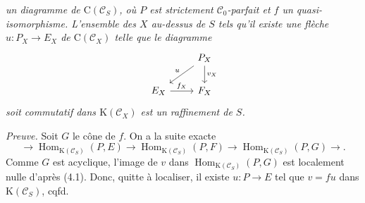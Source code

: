 \documentclass[11pt]{article}
\newcommand{\Spec}{\operatorname{Spec}}
\providecommand{\cC}{\mathcal C}
\providecommand{\Coker}{\operatorname{Coker}}
\providecommand{\Ker}{\operatorname{Ker}}
\providecommand{\cO}{\mathcal O}
\begin{document}
\providecommand{\cC}{\mathcal C}
\providecommand{\cD}{\mathcal D}
\providecommand{\cK}{\mathcal K}
\providecommand{\cO}{\mathcal O}
\providecommand{\cS}{\mathcal S}
\providecommand{\Cpx}{\mathrm C}
\providecommand{\Kpx}{\mathrm K}
\providecommand{\Dpx}{\mathrm D}
\providecommand{\D}{\mathrm D}
\providecommand{\Ho}{\mathrm H}
\providecommand{\RHom}{\mathrm R\!\operatorname{Hom}}
\providecommand{\Ob}{\operatorname{ob}}
\providecommand{\Coker}{\operatorname{Coker}}
\providecommand{\Ker}{\operatorname{Ker}}
\renewcommand{\Im}{\operatorname{Im}}
\providecommand{\Hom}{\operatorname{Hom}}
\providecommand{\Cone}{\operatorname{Cone}}
\providecommand{\id}{\operatorname{Id}}
\providecommand{\qis}{\xrightarrow{\sim}}



\providecommand{\RHom}{\mathrm R\!\Hom}
\providecommand{\Ext}{\operatorname{Ext}}
\providecommand{\coh}{\operatorname{coh}}
\providecommand{\PreCoh}{\operatorname{precoh}}
\providecommand{\Tr}{\operatorname{Tr}}
\providecommand{\Qis}{\operatorname{Qis}}
\providecommand{\Rad}{\operatorname{rad}}
\providecommand{\Spec}{\operatorname{Spec}}
\providecommand{\End}{\operatorname{End}}
\providecommand{\Id}{\operatorname{Id}}
\providecommand{\varinjlim}{\mathop{\mathrm{lim}}\limits_{\longrightarrow}}
\providecommand{\varprojlim}{\mathop{\mathrm{lim}}\limits_{\longleftarrow}}
\providecommand{\qcoh}{\operatorname{qcoh}}
\providecommand{\amp}{\operatorname{amp}}

\emph{un
diagramme de \(\Cpx(\mathcal C_S)\), où \(P\) est strictement \(\mathcal C_0\)-parfait et \(f\) un quasi-isomorphisme. L'ensemble des \(X\) au-dessus de \(S\) tels qu'il existe une flèche \(u:P_X\to E_X\) de \(\Cpx(\mathcal C_X)\) telle que le diagramme}
\[
\begin{tikzcd}
& P_X \arrow[d,"v_X"] \arrow[dl,"u"']\\
E_X \arrow[r,"f_X"] & F_X
\end{tikzcd}
\]
\emph{soit commutatif dans \(\Kpx(\mathcal C_X)\) est un raffinement de \(S\).}

\emph{Preuve.} Soit \(G\) le cône de \(f\). On a la suite exacte
\[
  \longrightarrow \Hom_{\Kpx(\mathcal C_S)}(P,E)
  \longrightarrow \Hom_{\Kpx(\mathcal C_S)}(P,F)
  \longrightarrow \Hom_{\Kpx(\mathcal C_S)}(P,G)
  \longrightarrow .
\]
Comme \(G\) est acyclique, l'image de \(v\) dans \(\Hom_{\Kpx(\mathcal C_S)}(P,G)\) est localement nulle d'après (4.1). Donc, quitte à localiser, il existe \(u:P\to E\) tel que \(v=fu\) dans \(\Kpx(\mathcal C_S)\), cqfd.
\end{document}
